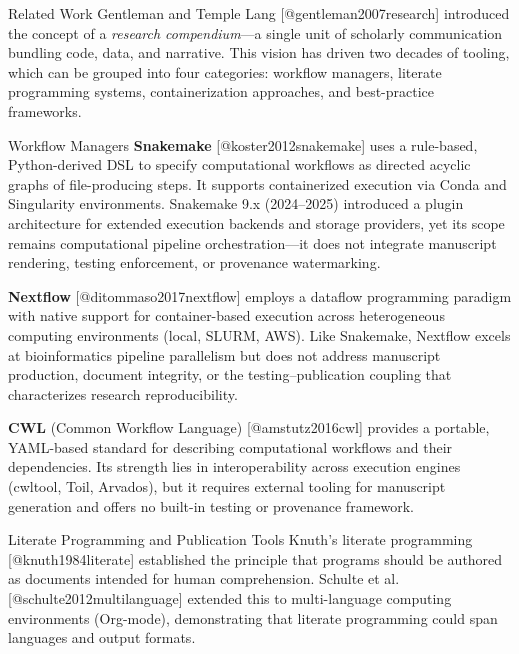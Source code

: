 \documentclass[
  ignorenonframetext,
]{beamer}
\begin{document}
\begin{frame}[fragile]{Related Work}
\protect{}\label{related-work}
Gentleman and Temple Lang {[}@gentleman2007research{]} introduced the
concept of a \emph{research compendium}---a single unit of scholarly
communication bundling code, data, and narrative. This vision has driven
two decades of tooling, which can be grouped into four categories:
workflow managers, literate programming systems, containerization
approaches, and best-practice frameworks.

\begin{block}{Workflow Managers}
\protect{}\label{workflow-managers}
\textbf{Snakemake} {[}@koster2012snakemake{]} uses a rule-based,
Python-derived DSL to specify computational workflows as directed
acyclic graphs of file-producing steps. It supports containerized
execution via Conda and Singularity environments. Snakemake 9.x
(2024--2025) introduced a plugin architecture for extended execution
backends and storage providers, yet its scope remains computational
pipeline orchestration---it does not integrate manuscript rendering,
testing enforcement, or provenance watermarking.

\textbf{Nextflow} {[}@ditommaso2017nextflow{]} employs a dataflow
programming paradigm with native support for container-based execution
across heterogeneous computing environments (local, SLURM, AWS). Like
Snakemake, Nextflow excels at bioinformatics pipeline parallelism but
does not address manuscript production, document integrity, or the
testing--publication coupling that characterizes research
reproducibility.

\textbf{CWL} (Common Workflow Language) {[}@amstutz2016cwl{]} provides a
portable, YAML-based standard for describing computational workflows and
their dependencies. Its strength lies in interoperability across
execution engines (cwltool, Toil, Arvados), but it requires external
tooling for manuscript generation and offers no built-in testing or
provenance framework.
\end{block}

\begin{block}{Literate Programming and Publication Tools}
\protect{}\label{literate-programming-and-publication-tools}
Knuth's literate programming {[}@knuth1984literate{]} established the
principle that programs should be authored as documents intended for
human comprehension. Schulte et al. {[}@schulte2012multilanguage{]}
extended this to multi-language computing environments (Org-mode),
demonstrating that literate programming could span languages and output
formats.


\end{block}
\end{frame}
\end{document}
